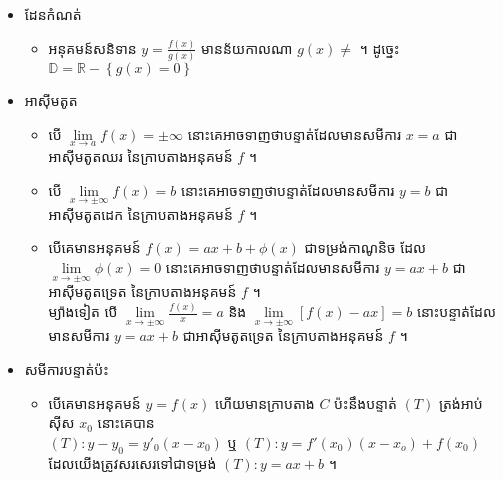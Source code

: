 \documentclass[12pt, a4paper]{article}
\begin{document}
\maketitle\koc
	\begin{itemize}
		\item \kml ដែនកំណត់\koc
		\begin{itemize}
			\item អនុគមន៍សនិទាន $y=\frac{f(x)}{g(x)}$ មានន័យកាលណា $g(x)\neq$ ។ ដូច្នេះ $\mathbb{D}=\mathbb{R}-\left\lbrace g(x)=0\right\rbrace$
		\end{itemize}
		\item \kml អាស៊ីមតូត\koc
		\begin{itemize}
			\item បើ $\lim\limits_{x\to a}f(x)=\pm\infty$ នោះគេអាចទាញថាបន្ទាត់ដែលមានសមីការ $x=a$ ជា អាស៊ីមតូតឈរ នៃក្រាបតាងអនុគមន៍ $f$ ។
			\item បើ $\lim\limits_{x\to \pm\infty}f(x)=b$ នោះគេអាចទាញថាបន្ទាត់ដែលមានសមីការ $y=b$ ជា អាស៊ីមតូតដេក នៃក្រាបតាងអនុគមន៍ $f$ ។
			\item បើគេមានអនុគមន៍ $f(x)=ax+b+\phi(x)$ ជាទម្រង់កាណូនិច ដែល $\lim\limits_{x\to\pm\infty}\phi(x)=0$ នោះគេអាចទាញថាបន្ទាត់ដែលមានសមីការ $y=ax+b$ ជា អាស៊ីមតូតទ្រេត នៃក្រាបតាងអនុគមន៍ $f$ ។\\
			ម្យ៉ាងទៀត បើ $\lim\limits_{x\to\pm\infty}\frac{f(x)}{x}=a$ និង $\lim\limits_{x\to\pm\infty}\left[f(x)-ax\right]=b$ នោះបន្ទាត់ដែលមានសមីការ $y=ax+b$ ជាអាស៊ីមតូតទ្រេត នៃក្រាបតាងអនុគមន៍ $f$ ។
		\end{itemize}
		\item \kml សមីការបន្ទាត់ប៉ះ\koc
		\begin{itemize}
			\item បើគេមានអនុគមន៍ $y=f(x)$ ហើយមានក្រាបតាង $C$ ប៉ះនឹងបន្ទាត់ $(T)$ ត្រង់អាប់ស៊ីស $x_0$ នោះគេបាន\\   $(T): y-y_0=y'_0(x-x_0)$ ឬ $(T): y=f'(x_0)(x-x_o)+f(x_0)$ ដែលយើងត្រូវសរសេរទៅជាទម្រង់ $(T): y=ax+b$ ។
		\end{itemize}
	\end{itemize}
\end{document}
